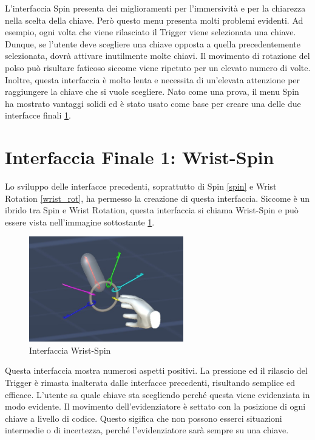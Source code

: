\documentclass[target=bach,aauheader=]{thud}
\begin{document}
L'interfaccia Spin presenta dei miglioramenti per l'immersività e per la chiarezza nella scelta della chiave.
Però questo menu presenta molti problemi evidenti.
Ad esempio, ogni volta che viene rilasciato il Trigger viene selezionata una chiave.
Dunque, se l'utente deve scegliere una chiave opposta a quella precedentemente selezionata, dovrà attivare inutilmente molte chiavi. 
Il movimento di rotazione del polso può risultare faticoso siccome viene ripetuto per un elevato numero di volte.
Inoltre, questa interfaccia è molto lenta e necessita di un'elevata attenzione per raggiungere la chiave che si vuole scegliere.
Nato come una prova, il menu Spin ha mostrato vantaggi solidi ed è stato usato come base per creare una delle due interfacce finali \ref{int_wrist-spin}.  

\section{Interfaccia Finale 1: Wrist-Spin} %
\label{int_wrist-spin}
Lo sviluppo delle interfacce precedenti, soprattutto di Spin \ref{spin} e Wrist Rotation \ref{wrist_rot}, ha permesso la creazione di questa interfaccia.
Siccome è un ibrido tra Spin e Wrist Rotation, questa interfaccia si chiama Wrist-Spin e può essere vista nell'immagine sottostante \ref{fig:wrist_spin}.

\begin{figure}[h]
    \centering
    \includegraphics[width=0.60\textwidth]{wrist_spin}
    \caption{Interfaccia Wrist-Spin}
    \label{fig:wrist_spin}
\end{figure}

Questa interfaccia mostra numerosi aspetti positivi.
La pressione ed il rilascio del Trigger è rimasta inalterata dalle interfacce precedenti, risultando semplice ed efficace.
L'utente sa quale chiave sta scegliendo perché questa viene evidenziata in modo evidente.
Il movimento dell'evidenziatore è settato con la posizione di ogni chiave a livello di codice. 
Questo sigifica che non possono esserci situazioni intermedie o di incertezza, perché l'evidenziatore sarà sempre su una chiave.
\end{document}
